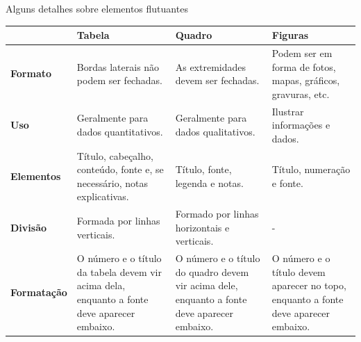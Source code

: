 \begin{quadro}[H]
	\centering
	\caption{Alguns detalhes sobre elementos flutuantes}
	\label{quadroex1}
	\begin{tabular}{|l|m{4cm}|m{4cm}|m{4cm}|}
		\hline
		& \textbf{Tabela}                                                                             & \textbf{Quadro}                                                                             & \textbf{Figuras}                                                                    \\ \hline
		\textbf{Formato}    & Bordas laterais não podem ser fechadas.                                                     & As extremidades devem ser fechadas.                                                         & Podem ser em forma de fotos, mapas, gráficos, gravuras, etc.                        \\ \hline
		\textbf{Uso}        & Geralmente para dados quantitativos.                                                        & Geralmente para dados qualitativos.                                                         & Ilustrar informações e dados.                                                       \\ \hline
		\textbf{Elementos}  & Título, cabeçalho, conteúdo, fonte e, se necessário, notas explicativas.                    & Título, fonte, legenda e notas.                                                             & Título, numeração e fonte.                                                          \\ \hline
		\textbf{Divisão}    & Formada por linhas verticais.                                                               & Formado por linhas horizontais e verticais.                                                 & -                                                                                   \\ \hline
		\textbf{Formatação} & O número e o título da tabela devem vir acima dela, enquanto a fonte deve aparecer embaixo. & O número e o título do quadro devem vir acima dele, enquanto a fonte deve aparecer embaixo. & O número e o título devem aparecer no topo, enquanto a fonte deve aparecer embaixo. \\ \hline
	\end{tabular}
\end{quadro}

